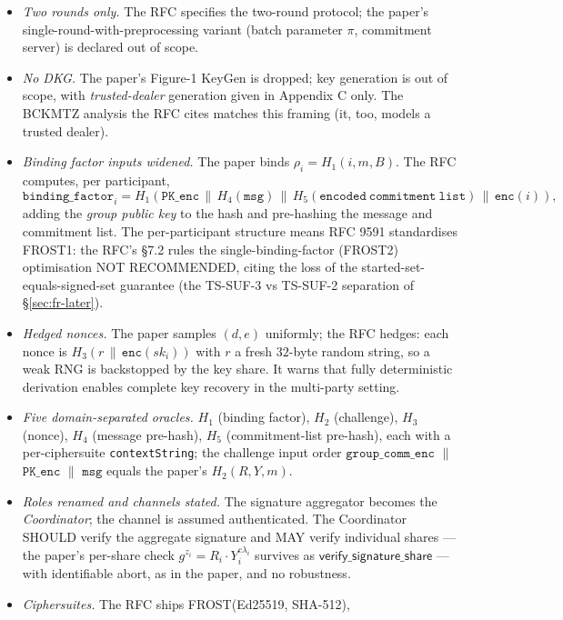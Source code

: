 \documentclass[11pt,a4paper]{article}
\theoremstyle{definition}
\begin{document}
\begin{itemize}
\item \emph{Two rounds only.} The RFC specifies the two-round protocol;
  the paper's single-round-with-preprocessing variant (batch parameter
  $\pi$, commitment server) is declared out of scope.
\item \emph{No DKG.} The paper's Figure-1 KeyGen is dropped; key
  generation is out of scope, with \emph{trusted-dealer} generation given
  in Appendix C only. The BCKMTZ analysis the RFC cites matches this
  framing (it, too, models a trusted dealer).
\item \emph{Binding factor inputs widened.} The paper binds
  $\rho_i = H_1(i, m, B)$. The RFC computes, per participant,
  \[
  \mathtt{binding\_factor}_i = H_1(\mathtt{PK\_enc} \,\|\,
  H_4(\mathtt{msg}) \,\|\, H_5(\mathtt{encoded\ commitment\ list}) \,\|\,
  \mathtt{enc}(i)),
  \]
  adding the \emph{group public key} to the hash and pre-hashing the
  message and commitment list. The per-participant structure means RFC
  9591 standardises FROST1: the RFC's \S7.2 rules the
  single-binding-factor (FROST2) optimisation NOT RECOMMENDED, citing the
  loss of the started-set-equals-signed-set guarantee (the TS-SUF-3 vs
  TS-SUF-2 separation of \S\ref{sec:fr-later}).
\item \emph{Hedged nonces.} The paper samples $(d, e)$ uniformly; the RFC
  hedges: each nonce is $H_3(r \,\|\, \mathtt{enc}(sk_i))$ with $r$ a
  fresh $32$-byte random string, so a weak RNG is backstopped by the key
  share. It warns that fully deterministic derivation enables complete
  key recovery in the multi-party setting.
\item \emph{Five domain-separated oracles.} $H_1$ (binding factor),
  $H_2$ (challenge), $H_3$ (nonce), $H_4$ (message pre-hash), $H_5$
  (commitment-list pre-hash), each with a per-ciphersuite
  \texttt{contextString}; the challenge input order
  $\mathtt{group\_comm\_enc}$ $\|$ $\mathtt{PK\_enc}$ $\|$
  $\mathtt{msg}$ equals the paper's $H_2(R, Y, m)$.
\item \emph{Roles renamed and channels stated.} The signature aggregator
  becomes the \emph{Coordinator}; the channel is assumed authenticated.
  The Coordinator SHOULD verify the aggregate signature and MAY verify
  individual shares --- the paper's per-share check
  $g^{z_i} = R_i \cdot Y_i^{c \lambda_i}$ survives as
  $\mathsf{verify\_signature\_share}$ --- with identifiable abort, as in
  the paper, and no robustness.
\item \emph{Ciphersuites.} The RFC ships FROST(Ed25519, SHA-512),

\end{itemize}
\end{document}
